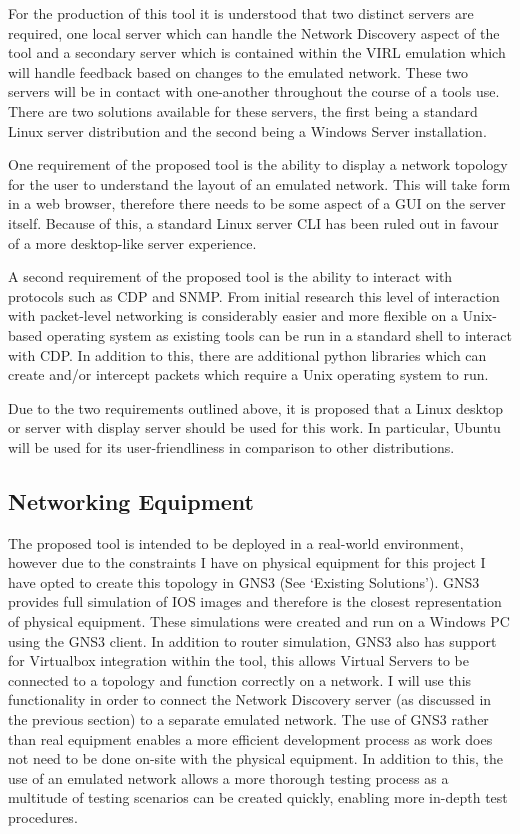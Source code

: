 \documentclass[11pt]{report}
\begin{document}
For the production of this tool it is understood that two distinct servers are required, one local server which can handle the Network Discovery aspect of the tool and a secondary server which is contained within the VIRL emulation which will handle feedback based on changes to the emulated network. These two servers will be in contact with one-another throughout the course of a tools use. There are two solutions available for these servers, the first being a standard Linux server distribution and the second being a Windows Server installation.

One requirement of the proposed tool is the ability to display a network topology for the user to understand the layout of an emulated network. This will take form in a web browser, therefore there needs to be some aspect of a GUI on the server itself. Because of this, a standard Linux server CLI has been ruled out in favour of a more desktop-like server experience.

A second requirement of the proposed tool is the ability to interact with protocols such as CDP and SNMP. From initial research this level of interaction with packet-level networking is considerably easier and more flexible on a Unix-based operating system as existing tools can be run in a standard shell to interact with CDP. In addition to this, there are additional python libraries which can create and/or intercept packets which require a Unix operating system to run.

Due to the two requirements outlined above, it is proposed that a Linux desktop or server with display server should be used for this work. In particular, Ubuntu will be used for its user-friendliness in comparison to other distributions.

\subsection{Networking Equipment}

The proposed tool is intended to be deployed in a real-world environment, however due to the constraints I have on physical equipment for this project I have opted to create this topology in GNS3 (See ‘Existing Solutions’). GNS3 provides full simulation of IOS images and therefore is the closest representation of physical equipment. These simulations were created and run on a Windows PC using the GNS3 client. In addition to router simulation, GNS3 also has support for Virtualbox integration within the tool, this allows Virtual Servers to be connected to a topology and function correctly on a network. I will use this functionality in order to connect the Network Discovery server (as discussed in the previous section) to a separate emulated network. The use of GNS3 rather than real equipment enables a more efficient development process as work does not need to be done on-site with the physical equipment. In addition to this, the use of an emulated network allows a more thorough testing process as a multitude of testing scenarios can be created quickly, enabling more in-depth test procedures.
\end{document}

